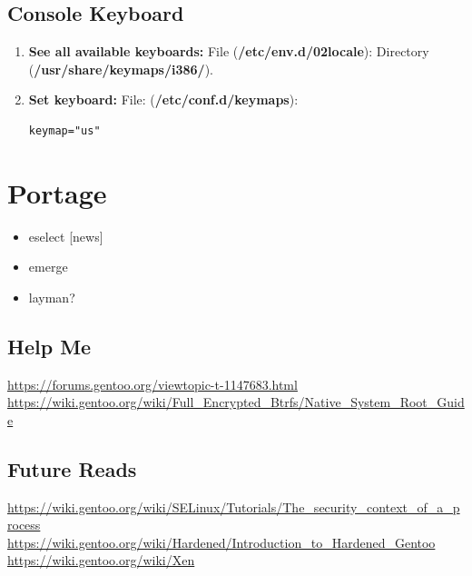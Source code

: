 \documentclass[10pt, a4paper, onecolumn, oneside, titlepage, openany]{book}
\begin{document}
\section{Console Keyboard}
\begin{enumerate}
    \item \textbf{See all available keyboards:}
\newline File (\textbf{\textcolor{file}{/etc/env.d/02locale}}):
\newline Directory (\textbf{\textcolor{dir}{/usr/share/keymaps/i386/}}).
    \item \textbf{Set keyboard:}
\newline File: (\textbf{\textcolor{file}{/etc/conf.d/keymaps}}):
\begin{verbatim}
keymap="us"
\end{verbatim}
\end{enumerate}

\chapter{Portage}
\begin{itemize}
    \item eselect [news]
    \item emerge
    \item layman?
\end{itemize}










\section{Help Me}
\url{https://forums.gentoo.org/viewtopic-t-1147683.html}
\url{https://wiki.gentoo.org/wiki/Full_Encrypted_Btrfs/Native_System_Root_Guide}

\section{Future Reads}
\url{https://wiki.gentoo.org/wiki/SELinux/Tutorials/The_security_context_of_a_process}
\url{https://wiki.gentoo.org/wiki/Hardened/Introduction_to_Hardened_Gentoo}
\url{https://wiki.gentoo.org/wiki/Xen}
\end{document}
